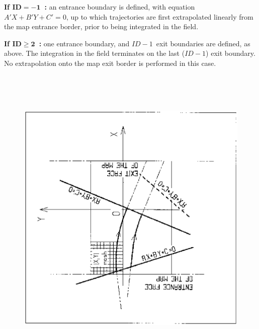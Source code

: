 {\medskip

\noindent \textbf{If  $\mathbf{ID = -1}$~:} an entrance boundary is 
defined, with equation $A'X + B'Y + C'=0 $, up to which  trajectories are 
first extrapolated linearly from the map entrance border, prior to being 
integrated in the field.

\medskip

\noindent \textbf{If  $\mathbf{ID \geq 2}$~:} one entrance boundary, and 
$ID-1$~exit boundaries are defined, as above. The integration in the 
field terminates on the last ($ID - 1$) exit boundary. No extrapolation onto 
the map exit  border is performed in this case.

\newpage

\begin{figure}[H]
\centerline{\includegraphics[height=15cm,angle=-90]{Fig15.ps}}
{\setlength{\captionwidth}{16cm}
}
\end{figure}
\vfill
\newpage

}
